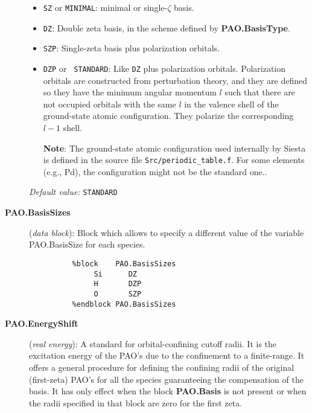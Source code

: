 \documentclass[11pt]{article}
\begin{document}
\begin{description}
\begin{itemize}

\item {\tt SZ} or {\tt MINIMAL}: minimal or single-$\zeta$
basis.

\item {\tt DZ}: Double zeta basis, in the scheme
defined by {\bf PAO.BasisType}.

\item {\tt SZP}: Single-zeta basis plus polarization 
orbitals.

\item {\tt DZP} or {\tt
STANDARD}: Like {\tt DZ} plus
polarization orbitals.  Polarization orbitals are constructed from
perturbation theory, and they are
defined so they have the minimum angular
momentum $l$ such that there are not occupied orbitals with the same
$l$ in the valence shell of the ground-state atomic
configuration. They polarize the corresponding $l-1$ shell.

{\bf Note}: The ground-state atomic configuration used internally
by {\sc Siesta} is defined in the source file {\tt Src/periodic\_table.f}. 
For some elements (e.g., Pd), the configuration might not be the
standard one..

\end{itemize}

{\it Default value:} {\tt STANDARD}

\item[{\bf PAO.BasisSizes}]({\it data block}): 
Block which allows to specify a different value of the variable 
PAO.BasisSize for each species. 
\begin{verbatim}
          %block    PAO.BasisSizes
               Si      DZ
               H       DZP
               O       SZP 
          %endblock PAO.BasisSizes
\end{verbatim} 


\item[{\bf PAO.EnergyShift}] ({\it real energy}): A standard for 
orbital-confining cutoff radii. It is the excitation energy
of the PAO's due to the confinement to a finite-range. It offers a
general procedure for defining the confining radii of the original
(first-zeta) PAO's for all the species guaranteeing the compensation 
of the basis. It has only effect when the block
{\bf PAO.Basis} is not present or when the radii
specified in that block are zero for the first zeta.


\end{description}
\end{document}

